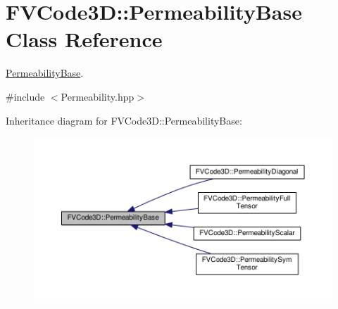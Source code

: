 \hypertarget{classFVCode3D_1_1PermeabilityBase}{}\section{F\+V\+Code3D\+:\+:Permeability\+Base Class Reference}
\label{classFVCode3D_1_1PermeabilityBase}


\hyperlink{classFVCode3D_1_1PermeabilityBase}{Permeability\+Base}.  




{\ttfamily \#include $<$Permeability.\+hpp$>$}



Inheritance diagram for F\+V\+Code3D\+:\+:Permeability\+Base\+:
\nopagebreak
\begin{figure}[H]
\begin{center}
\leavevmode
\includegraphics[width=350pt]{classFVCode3D_1_1PermeabilityBase__inherit__graph}
\end{center}
\end{figure}
